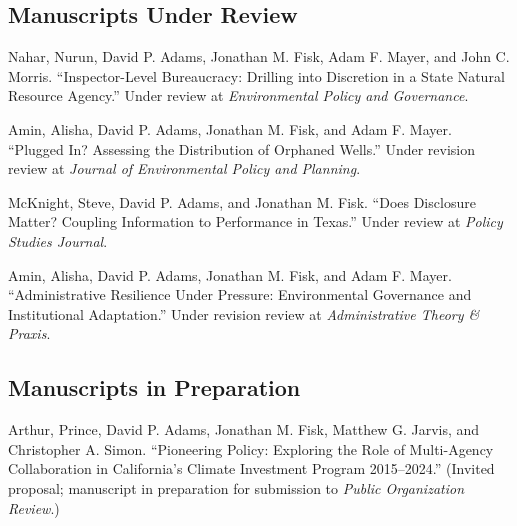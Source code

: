 \documentclass[12pt,letterpaper]{article}
\renewenvironment{itemize}{
  \begin{list}{}{
    \setlength{\leftmargin}{1.5em}
    \setlength{\itemsep}{0.25em}
    \setlength{\parskip}{0pt}
    \setlength{\parsep}{0.25em}
  }
}{
  \end{list}
}
\begin{document}
\subsection*{Manuscripts Under Review}
\begin{itemize}\leftmargin=2pt\itemindent=-15pt\leftmargin=2pt\itemindent=-15pt
  
  \item Nahar, Nurun, David P. Adams, Jonathan M. Fisk, Adam F. Mayer, and John C. Morris. ``Inspector-Level Bureaucracy: Drilling into Discretion in a State Natural Resource Agency.'' Under review at \emph{Environmental Policy and Governance}.
  
  \item Amin, Alisha, David P. Adams, Jonathan M. Fisk, and Adam F. Mayer. ``Plugged In? Assessing the Distribution of Orphaned Wells.'' Under revision review at \emph{Journal of Environmental Policy and Planning}.
  
  \item McKnight, Steve, David P. Adams, and Jonathan M. Fisk. ``Does Disclosure Matter? Coupling Information to Performance in Texas.'' Under review at \emph{Policy Studies Journal}.

  \item Amin, Alisha, David P. Adams, Jonathan M. Fisk, and Adam F. Mayer. ``Administrative Resilience Under Pressure: Environmental Governance and Institutional Adaptation.'' Under revision review at \emph{Administrative Theory \& Praxis}.

\end{itemize}


\subsection*{Manuscripts in Preparation}
  \begin{itemize} \leftmargin=2pt\itemindent=-15pt
    \item Arthur, Prince, David P. Adams, Jonathan M. Fisk, Matthew G. Jarvis, and Christopher A. Simon. ``Pioneering Policy: Exploring the Role of Multi-Agency Collaboration in California's Climate Investment Program 2015--2024.'' (Invited proposal; manuscript in preparation for submission to \textit{Public Organization Review}.)
  \end{itemize}
\end{document}
